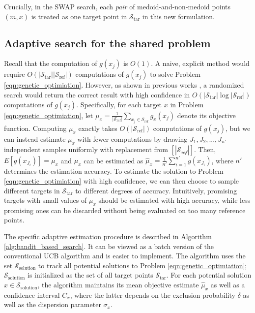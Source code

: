 Crucially, in the SWAP search, each \textit{pair} of medoid-and-non-medoid points $(m,x)$ is treated as one target point in $\mathcal{S}_{\text{tar}}$ in this new formulation.

\subsection{Adaptive search for the shared problem}
Recall that the computation of $g(x_j)$ is $O(1)$.
A naive, explicit method would require $O(\vert \mathcal{S}_{\text{tar}} \vert \vert \mathcal{S}_{\text{ref}} \vert)$ computations of $g(x_j)$ to solve Problem \eqref{eqn:genetic_optimiation}. 
However, as shown in previous works \cite{bagaria2018medoids,bagaria2018adaptive}, a randomized search would return the correct result with high confidence in $O( \vert \mathcal{S}_{\text{tar}}\vert \log  \vert \mathcal{S}_{\text{ref}} \vert)$ computations of $g(x_j)$.
Specifically, for each target $x$ in Problem \eqref{eqn:genetic_optimiation}, let $\mu_x = \frac{1}{\vert \mathcal{S}_{\text{ref}} \vert } \sum_{x_j \in \mathcal{S}_{\text{ref}}} g_x(x_j)$ denote its objective function. Computing $\mu_x$ exactly takes $O(\vert \mathcal{S}_{\text{ref}} \vert)$ computations of $g(x_j)$, but we can instead estimate $\mu_x$ with fewer computations by drawing $J_1,J_2,...,J_{n'}$ independent samples uniformly with replacement from $[|\mathcal{S_{\text{ref}}}|]$.
Then, $E[g(x_{J_i})] = \mu_x$ and $\mu_x$ can be estimated as $\hat{\mu}_x = \frac{1}{n'} \sum_{i=1}^{n'} g(x_{J_i})$, where $n'$ determines the estimation accuracy. 
To estimate the solution to Problem \eqref{eqn:genetic_optimiation} with high confidence, we can then choose to sample different targets in $\mathcal{S}_{\text{tar}}$ to different degrees of accuracy. 
Intuitively, promising targets with small values of $\mu_x$ should be estimated with high accuracy, while less promising ones can be discarded without being evaluated on too many reference points. 


The specific adaptive estimation procedure is described in Algorithm \ref{alg:bandit_based_search}. 
It can be viewed as a batch version of the conventional UCB algorithm \cite{lai1985asymptotically,zhang2019adaptive} and is easier to implement.
The algorithm uses the set $\mathcal{S}_{\text{solution}}$ to track all potential solutions to Problem \eqref{eqn:genetic_optimiation}; $\mathcal{S}_{\text{solution}}$ is initialized as the set of all target points $\mathcal{S}_{\text{tar}}$. For each potential solution $x\in \mathcal{S}_{\text{solution}}$, the algorithm maintains its mean objective estimate $\hat{\mu}_x$ as well as a confidence interval $C_x$, where the latter depends on the exclusion probability $\delta$ as well as the dispersion parameter $\sigma_x$.

